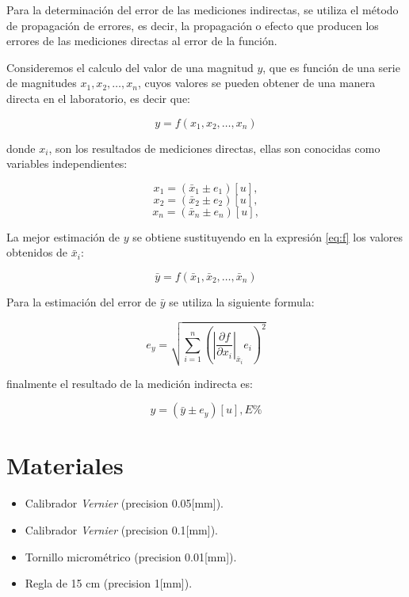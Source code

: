 \documentclass[letter,11pt]{article}
\begin{document}
Para la determinación del error de las mediciones indirectas, se utiliza el
método de propagación de errores, es decir, la propagación o efecto que
producen los errores de las mediciones directas al error de la función.

Consideremos el calculo del valor de una magnitud $y$, que es función de una
serie de magnitudes $x_1, x_2, \dots, x_n$, cuyos valores se pueden obtener de
una manera directa en el laboratorio, es decir que:

\begin{equation}
\label{eq:f}
    y = f(x_1,x_2,\dots,x_n)
\end{equation}

donde $x_i$, son los resultados de mediciones directas, ellas son conocidas como
variables independientes:

\begin{equation}x_1 = (\bar{x}_1 \pm e_1)[u],\end{equation}
\begin{equation}x_2 = (\bar{x}_2 \pm e_2)[u],\end{equation}
\begin{equation}x_n = (\bar{x}_n \pm e_n)[u],\end{equation}

La mejor estimación de $y$ se obtiene sustituyendo en la expresión \ref{eq:f}
los valores obtenidos de $\bar{x}_i$:

\begin{equation}
    \bar{y} = f(\bar{x}_1,\bar{x}_2,\dots,\bar{x}_n)
\end{equation}

Para la estimación del error de $\bar{y}$ se utiliza la siguiente formula:

\begin{equation}
    e_y = \sqrt{\sum_{i=1}^{n}
    \left(\left|\frac{\partial{f}}{\partial{x_i}}\right|_{\bar{x}_i}
    e_i\right)^2}
\end{equation}

finalmente el resultado de la medición indirecta es:

\begin{equation}
    y = (\bar{y} \pm e_y)[u], E\%
\end{equation}

\section{Materiales}
\begin{itemize}
\item Calibrador \emph{Vernier} (precision 0.05[mm]).
\item Calibrador \emph{Vernier} (precision 0.1[mm]).
\item Tornillo micrométrico (precision 0.01[mm]).
\item Regla de 15 cm (precision 1[mm]).
\end{itemize}
\end{document}
